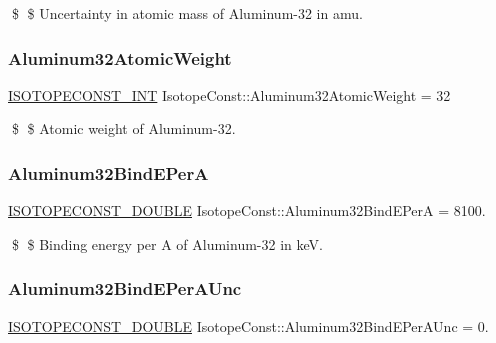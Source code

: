 \$ \$ Uncertainty in atomic mass of Aluminum-\/32 in amu. \mbox{\label{group___isotope_const-_aluminum-_al32_ga69d6406cdd6c0276214fe59e71171888}} 
\subsubsection{\texorpdfstring{Aluminum32\+Atomic\+Weight}{Aluminum32AtomicWeight}}
{\footnotesize\ttfamily \mbox{\hyperlink{group___isotope_const-_macros_ga5f18360b3e99483a35c32d789e62621c}{I\+S\+O\+T\+O\+P\+E\+C\+O\+N\+S\+T\+\_\+\+I\+NT}} Isotope\+Const\+::\+Aluminum32\+Atomic\+Weight = 32}

\$ \$ Atomic weight of Aluminum-\/32. \mbox{\label{group___isotope_const-_aluminum-_al32_gab42b3ea9faac3acb11a32367b27da59c}} 
\subsubsection{\texorpdfstring{Aluminum32\+Bind\+E\+PerA}{Aluminum32BindEPerA}}
{\footnotesize\ttfamily \mbox{\hyperlink{group___isotope_const-_macros_ga8f45a7272ce02c0b4c65c44636ed719a}{I\+S\+O\+T\+O\+P\+E\+C\+O\+N\+S\+T\+\_\+\+D\+O\+U\+B\+LE}} Isotope\+Const\+::\+Aluminum32\+Bind\+E\+PerA = 8100.}

\$ \$ Binding energy per A of Aluminum-\/32 in keV. \mbox{\label{group___isotope_const-_aluminum-_al32_ga59c16fd25a7d7ed27da96ffb7edc2888}} 
\subsubsection{\texorpdfstring{Aluminum32\+Bind\+E\+Per\+A\+Unc}{Aluminum32BindEPerAUnc}}
{\footnotesize\ttfamily \mbox{\hyperlink{group___isotope_const-_macros_ga8f45a7272ce02c0b4c65c44636ed719a}{I\+S\+O\+T\+O\+P\+E\+C\+O\+N\+S\+T\+\_\+\+D\+O\+U\+B\+LE}} Isotope\+Const\+::\+Aluminum32\+Bind\+E\+Per\+A\+Unc = 0.}

